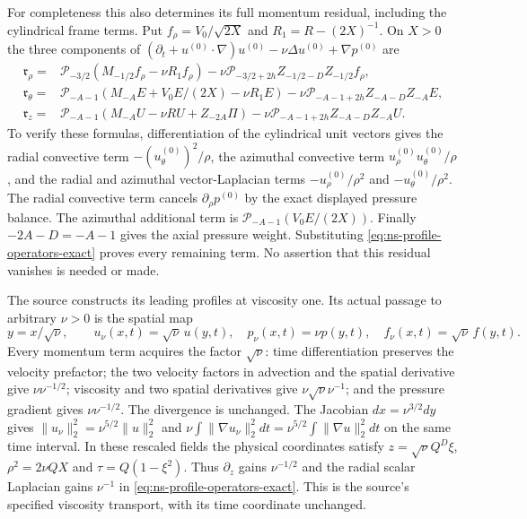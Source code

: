 For completeness this also determines its full momentum residual,
including the cylindrical frame terms. Put $f_\rho=V_0/\sqrt{2X}$
and $R_1=R-(2X)^{-1}$. On $X>0$ the three components of
$(\partial_t+u^{(0)}\cdot\nabla)u^{(0)}-\nu\Delta u^{(0)}
+\nabla p^{(0)}$ are
\begin{align*}
 \mathfrak r_\rho={}&\mathcal P_{-3/2}
       (M_{-1/2}f_\rho-\nu R_1f_\rho)
       -\nu\mathcal P_{-3/2+2h}Z_{-1/2-D}Z_{-1/2}f_\rho,\\
 \mathfrak r_\theta={}&\mathcal P_{-A-1}
       (M_{-A}E+V_0E/(2X)-\nu R_1E)
       -\nu\mathcal P_{-A-1+2h}Z_{-A-D}Z_{-A}E,\\
 \mathfrak r_z={}&\mathcal P_{-A-1}
       (M_{-A}U-\nu RU+Z_{-2A}\Pi)
       -\nu\mathcal P_{-A-1+2h}Z_{-A-D}Z_{-A}U.
\end{align*}
To verify these formulas, differentiation of the cylindrical unit
vectors gives the radial convective term $-(u_\theta^{(0)})^2/\rho$,
the azimuthal convective term $u_\rho^{(0)}u_\theta^{(0)}/\rho$,
and the radial and azimuthal vector-Laplacian terms
$-u_\rho^{(0)}/\rho^2$ and $-u_\theta^{(0)}/\rho^2$.
The radial convective term cancels $\partial_\rho p^{(0)}$ by
the exact displayed pressure balance. The azimuthal additional term
is $\mathcal P_{-A-1}(V_0E/(2X))$.
Finally $-2A-D=-A-1$ gives the axial pressure weight. Substituting
\eqref{eq:ns-profile-operators-exact} proves every remaining term.
No assertion that this residual vanishes is needed or made.

The source constructs its leading profiles at viscosity one. Its
actual passage to arbitrary $\nu>0$ is the spatial map
\[
 y=x/\sqrt\nu,\qquad
 u_\nu(x,t)=\sqrt\nu\,u(y,t),\quad
 p_\nu(x,t)=\nu p(y,t),\quad
 f_\nu(x,t)=\sqrt\nu\,f(y,t).
\]
Every momentum term acquires the factor $\sqrt\nu$: time
differentiation preserves the velocity prefactor; the two velocity
factors in advection and the spatial derivative give
$\nu\nu^{-1/2}$; viscosity and two spatial derivatives give
$\nu\sqrt\nu\nu^{-1}$; and the pressure gradient gives
$\nu\nu^{-1/2}$. The divergence is unchanged. The Jacobian
$dx=\nu^{3/2}dy$ gives
$\|u_\nu\|_2^2=\nu^{5/2}\|u\|_2^2$ and
$\nu\int\|\nabla u_\nu\|_2^2dt
=\nu^{5/2}\int\|\nabla u\|_2^2dt$ on the same time interval.
In these rescaled fields the physical coordinates satisfy
$z=\sqrt\nu Q^D\xi$, $\rho^2=2\nu QX$ and
$\tau=Q(1-\xi^2)$. Thus $\partial_z$ gains $\nu^{-1/2}$
and the radial scalar Laplacian gains $\nu^{-1}$ in
\eqref{eq:ns-profile-operators-exact}. This is the source's specified
viscosity transport, with its time coordinate unchanged.

